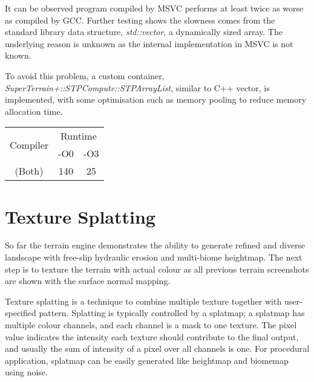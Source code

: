 \documentclass[oneside, a4paper]{report}
\begin{document}
    It can be observed program compiled by MSVC performs at least twice as worse as compiled by GCC. Further testing shows the slowness comes from the standard library data structure, \textit{std::vector}, a dynamically sized array. The underlying reason is unknown as the internal implementation in MSVC is not known.

    To avoid this problem, a custom container, \textit{SuperTerrain+::STPCompute::STPArrayList}, similar to C++ vector, is implemented, with some optimisation such as memory pooling to reduce memory allocation time.
    
    \begin{center}
        \begin{tabular}{|c||c|c|}
            \hline
            \multirow{2}{*}{Compiler} & 
            \multicolumn{2}{c|}{Runtime} \\
            & -O0 & -O3 \\
            \hline
            \hline
            (Both) & 140 & 25 \\
            \hline
        \end{tabular}
    \end{center}

    \section{Texture Splatting}

    So far the terrain engine demonstrates the ability to generate refined and diverse landscape with free-slip hydraulic erosion and multi-biome heightmap. The next step is to texture the terrain with actual colour as all previous terrain screenshots are shown with the surface normal mapping.

    Texture splatting \cite{texture_splatting} is a technique to combine multiple texture together with user-specified pattern. Splatting is typically controlled by a splatmap; a splatmap has multiple colour channels, and each channel is a mask to one texture. The pixel value indicates the intensity each texture should contribute to the final output, and usually the sum of intensity of a pixel over all channels is one. For procedural application, splatmap can be easily generated like heightmap and biomemap using noise.
\end{document}
